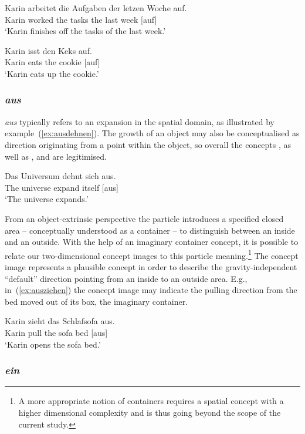\documentclass[output=paper]{langsci/langscibook}
\begin{document}
\ea\label{ex:aufarbeiten}
\gll Karin arbeitet die Aufgaben der letzen Woche auf.\\
Karin worked the tasks the last week [auf]\\
\glt `Karin finishes off the tasks of the last week.'
\z

\ea\label{ex:aufessen}
\gll Karin isst den Keks auf.\\
Karin eats the cookie [auf]\\
\glt `Karin eats up the cookie.'
\z

\subsubsection{\textit{aus}}

\textit{aus} typically refers to an expansion in the spatial domain,
as illustrated by example~(\ref{ex:ausdehnen}). The growth of an
object may also be conceptualised as direction originating from a
point within the object, so overall the concepts ,
 as well as ,
 and  are legitimised.

\ea\label{ex:ausdehnen}
\gll Das Universum dehnt sich aus.\\
The universe expand itself [aus]\\
\glt `The universe expands.'
\z

From an object-extrinsic perspective the particle introduces a
specified closed area -- conceptually understood as a container -- to
distinguish between an inside and an outside. With the help of an
imaginary container concept, it is possible to relate our
two-dimensional concept images to this particle meaning.\footnote{A more
  appropriate notion of containers requires a spatial concept with a
  higher dimensional complexity and is thus going beyond the scope of
  the current study.} The concept image  represents a
plausible concept in order to describe the gravity-independent
``default'' direction pointing from an inside to an outside area.
E.g., in~(\ref{ex:ausziehen}) the concept image  may
indicate the pulling direction from the bed moved out of its box, the
imaginary container.

\ea\label{ex:ausziehen}
\gll Karin zieht das Schlafsofa aus.\\
Karin pull the {sofa bed} [aus]\\
\glt `Karin opens the sofa bed.'
\z


\subsubsection{\textit{ein}}
\end{document}
